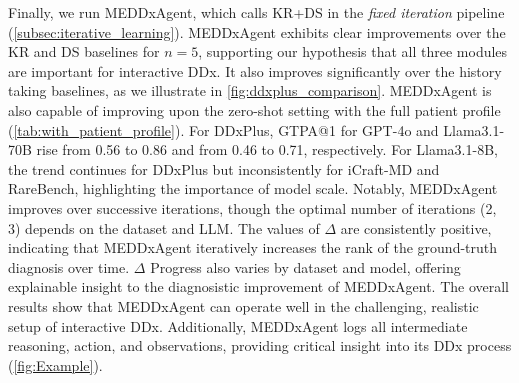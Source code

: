 Finally, we run MEDDxAgent, which calls KR+DS in the \textit{fixed iteration} pipeline (\autoref{subsec:iterative_learning}). MEDDxAgent exhibits clear improvements over the KR and DS baselines for $n=5$, supporting our hypothesis that all three modules are important for interactive DDx. It also improves significantly over the history taking baselines, as we illustrate in \autoref{fig:ddxplus_comparison}. MEDDxAgent is also capable of improving upon the zero-shot setting with the full patient profile (\autoref{tab:with_patient_profile}). For DDxPlus, GTPA@1 for GPT-4o and Llama3.1-70B rise from 0.56 to 0.86 and from 0.46 to 0.71, respectively. For Llama3.1-8B, the trend continues for DDxPlus but inconsistently for iCraft-MD and RareBench, highlighting the importance of model scale. Notably, MEDDxAgent improves over successive iterations, though the optimal number of iterations (2, 3) depends on the dataset and LLM. The values of $\Delta$ are consistently positive, indicating that MEDDxAgent iteratively increases the rank of the ground-truth diagnosis over time. $\Delta$ Progress also varies by dataset and model, offering explainable insight to the diagnosistic improvement of MEDDxAgent. The overall results show that MEDDxAgent can operate well in the challenging, realistic setup of interactive DDx. Additionally, MEDDxAgent logs all intermediate reasoning, action, and observations, providing critical insight into its DDx process (\autoref{fig:Example}).
\vspace{-0.5em}